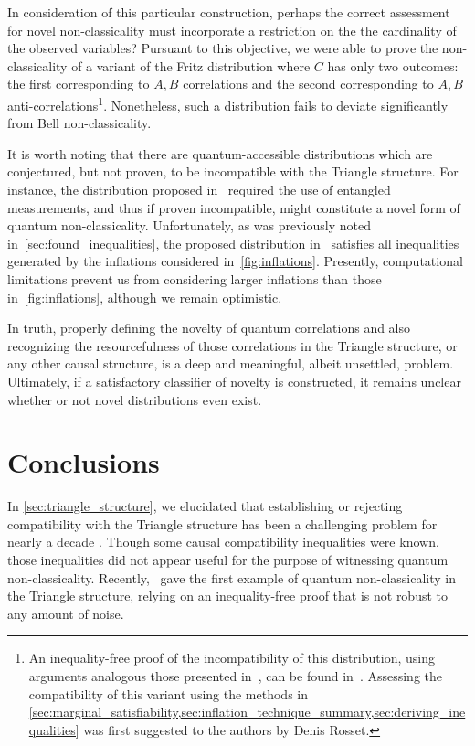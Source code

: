 \documentclass[aps, 10pt, english, twoside, pra, nofootinbib, tightenlines, longbibliography, superscriptaddress]{revtex4-1}
\begin{document}
    In consideration of this particular construction, perhaps the correct assessment for novel non-classicality must incorporate a restriction on the the cardinality of the observed variables? Pursuant to this objective, we were able to prove the non-classicality of a variant of the Fritz distribution where $C$ has only two outcomes: the first corresponding to $A, B$ correlations and the second corresponding to $A, B$ anti-correlations\footnote{An inequality-free proof of the incompatibility of this distribution, using arguments analogous those presented in~\cite{Fritz_2012}, can be found in~\cite{Weilenmann_2016}. Assessing the compatibility of this variant using the methods in \cref{sec:marginal_satisfiability,sec:inflation_technique_summary,sec:deriving_inequalities} was first suggested to the authors by Denis Rosset.}. Nonetheless, such a distribution fails to deviate significantly from Bell non-classicality.

    It is worth noting that there are quantum-accessible distributions which are conjectured, but not proven, to be incompatible with the Triangle structure. For instance, the distribution proposed in~\cite{Gisin_2017} required the use of entangled measurements, and thus if proven incompatible, might constitute a novel form of quantum non-classicality. Unfortunately, as was previously noted in~\cref{sec:found_inequalities}, the proposed distribution in~\cite{Gisin_2017} satisfies all inequalities generated by the inflations considered in~\cref{fig:inflations}. Presently, computational limitations prevent us from considering larger inflations than those in~\cref{fig:inflations}, although we remain optimistic.

    In truth, properly defining the novelty of quantum correlations and also recognizing the resourcefulness of those correlations in the Triangle structure, or any other causal structure, is a deep and meaningful, albeit unsettled, problem. Ultimately, if a satisfactory classifier of novelty is constructed, it remains unclear whether or not novel distributions even exist.

    \section{Conclusions}
    \label{sec:conclusions}
    In \cref{sec:triangle_structure}, we elucidated that establishing or rejecting compatibility with the Triangle structure has been a challenging problem for nearly a decade \cite{Steudel_2010,Branciard_2012,Henson_2014,Fritz_2012,Gisin_2017}. Though some causal compatibility inequalities were known, those inequalities did not appear useful for the purpose of witnessing quantum non-classicality. Recently,~\citet{Fritz_2012} gave the first example of quantum non-classicality in the Triangle structure, relying on an inequality-free proof that is not robust to any amount of noise.
\end{document}
